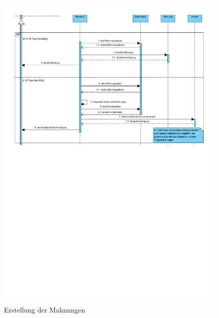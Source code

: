 \begin{figure}[!ht]
    \centering
    \includegraphics[width=\textwidth, trim = 0cm 16cm 0cm 0cm]{Bilder/Diagramme/SD_Buchungsvorgang_04.pdf}
    \caption{Erstellung der Mahnungen}
    \label{img:buchung04}
\end{figure}